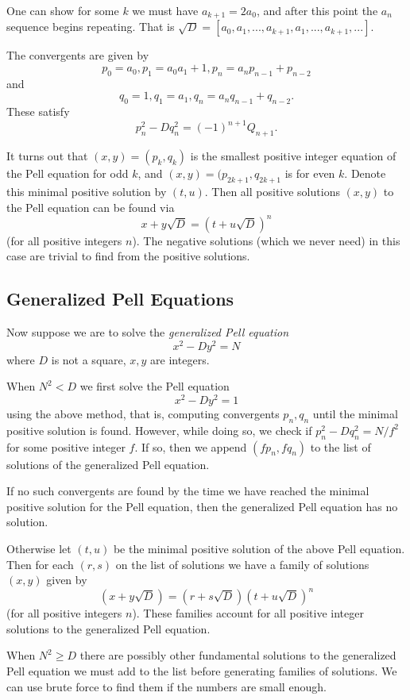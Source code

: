 One can show for some $k$ we must have $a_{k+1} = 2 a_0$, and after
this point the $a_n$ sequence begins repeating. That is
$\sqrt{D} = [a_0, a_1, ..., a_{k+1}, a_1, ..., a_{k+1}, ... ]$.

The convergents are given by
\[ p_0 = a_0, p_1 = a_0 a_1 + 1, p_n = a_n p_{n-1} + p_{n-2} \]
and
\[ q_0 = 1, q_1 = a_1, q_n = a_n q_{n-1} + q_{n-2} .\]
These satisfy
\[ p_n^2 - D q_n^2 = (-1)^{n+1} Q_{n+1} . \]

It turns out that $(x, y) = (p_k, q_k)$ is the smallest positive
integer equation
of the Pell equation for odd $k$, and $(x, y) = (p_{2k+1}, q_{2k+1}$ is for
even $k$. Denote this minimal positive solution by $(t, u)$.
Then all positive solutions $(x, y)$ to the Pell equation can be found via
\[ x + y\sqrt{D} = (t+u\sqrt{D})^n\]
(for all positive integers $n$). The negative solutions (which we
never need) in this case are trivial to find from the positive solutions.

\subsection {Generalized Pell Equations}

Now suppose we are to solve the \emph{generalized Pell equation}
\[ x^2 - D y^2 = N \]
where $D$ is not a square, $x, y$ are integers.

When $N^2 < D$ we first solve the Pell equation
\[ x^2 - D y^2 = 1 \]
using the above method, that is, computing convergents $p_n, q_n$
until the minimal positive solution is found. However,
while doing so, we check if $p_n^2 - D q_n^2 = N / f^2$ for
some positive integer $f$. If so, then we append $(f p_n, f q_n)$ to
the list of solutions of the generalized Pell equation.

If no such convergents are found by the time we have reached the minimal
positive solution for the Pell equation, then the generalized Pell
equation has no solution.

Otherwise let $(t, u)$ be the minimal positive solution of the above
Pell equation.
Then for each $(r,s)$ on the list of solutions we have a family of
solutions $(x,y)$ given by
\[ (x+y\sqrt{D}) = (r+s\sqrt{D})(t+u\sqrt{D})^n \]
(for all positive integers $n$). These families account for all positive
integer solutions to the generalized Pell equation.

When $N^2 \ge D$ there are possibly other fundamental solutions
to the generalized Pell equation we must add to the list before generating
families of solutions.
We can use brute force to find them if the numbers are small enough.

